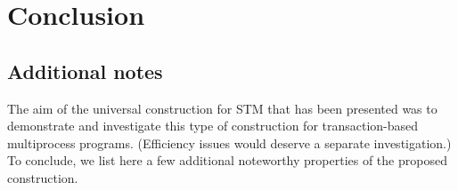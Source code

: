 

\section{Conclusion}
\label{sec:conclusion}



\subsection{Additional notes}
\label{sec:discussion} 

The aim of the universal construction for STM that has been presented 
was to demonstrate and investigate this type of construction for
transaction-based multiprocess programs. (Efficiency issues 
would deserve  a separate investigation.) To  conclude, we list  here a few
additional noteworthy properties of the proposed  construction. 

